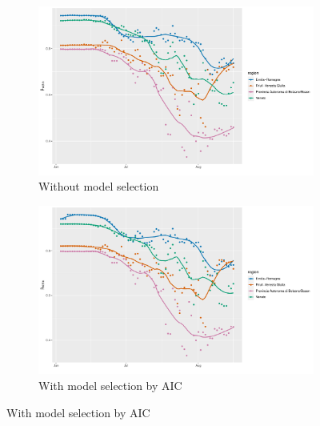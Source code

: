 \documentclass[12pt]{article}
\begin{document}
	\begin{figure}[H]
	    \centering
	    \begin{subfigure}{\textwidth}
	      \centering
	      \includegraphics[width=0.95\linewidth]{output/model1_lag3_betawithin_Nord-Est_rolling.pdf}
	      \caption{Without model selection}
	      \label{fig:beta_within_over_time_nordest_regular}
	    \end{subfigure}\newline
	    \begin{subfigure}{\textwidth}
	      \centering
	      \includegraphics[width=0.95\linewidth]{output/model1_lag3_betawithin_Nord-Est_aic_rolling.pdf}
	      \caption{With model selection by AIC}
	      \label{fig:beta_within_over_time_nordest_aic}
	    \end{subfigure}
	\end{figure}
\end{document}
